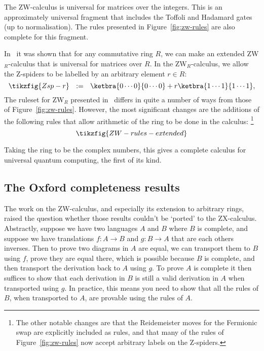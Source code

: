 \documentclass[a4paper,onecolumn,superscriptaddress,11pt,%
				unpublished,%
				allowfontchageintitle,%
				]{quantumarticle}
\begin{document}
The ZW-calculus is universal for matrices over the integers. This is an approximately universal fragment that includes the Toffoli and Hadamard gates (up to normalisation). The rules presented in Figure~\ref{fig:zw-rules} are also complete for this fragment.

In~\cite{HarnyAmarCompleteness} it was shown that for any commutative ring $R$, we can make an extended ZW$_R$-calculus that is universal for matrices over $R$. 
In the ZW$_R$-calculus, we allow the Z-spiders to be labelled by an arbitrary element $r\in R$:
\begin{equation}\label{eq:Z-spider-r}
\tikzfig{Zsp-r} \ \ :=\ \ \ketbra{0 \cdots 0}{0 \cdots 0} + r \ketbra{1 \cdots 1}{1 \cdots 1},
\end{equation}
The ruleset for ZW$_R$ presented in~\cite{HarnyAmarCompleteness} differs in quite a number of ways from those of Figure~\ref{fig:zw-rules}. However, the most significant changes are the additions of the following rules that allow arithmetic of the ring to be done in the calculus:%
\footnote{The other notable changes are that the Reidemeister moves for the Fermionic swap are explicitly included as rules, and that many of the rules of Figure~\ref{fig:zw-rules} now accept arbitrary labels on the Z-spiders.}
\begin{equation}
\tikzfig{ZW-rules-extended}
\end{equation}

Taking the ring to be the complex numbers, this gives a complete calculus for universal quantum computing, the first of its kind.


\subsection{The Oxford completeness results}\label{sec:completeness-oxford}

The work on the ZW-calculus, and especially its extension to arbitrary rings, raised the question whether those results couldn't be `ported' to the ZX-calculus.
Abstractly, suppose we have two languages $A$ and $B$ where $B$ is complete, and suppose we have translations $f:A\rightarrow B$ and $g:B\rightarrow A$ that are each others inverses. Then to prove two diagrams in $A$ are equal, we can transport them to $B$ using $f$, prove they are equal there, which is possible because $B$ is complete, and then transport the derivation back to $A$ using $g$.
To prove $A$ is complete it then suffices to show that each derivation in $B$ is still a valid derivation in $A$ when transported using $g$. In practice, this means you need to show that all the rules of $B$, when transported to $A$, are provable using the rules of $A$.
\end{document}
